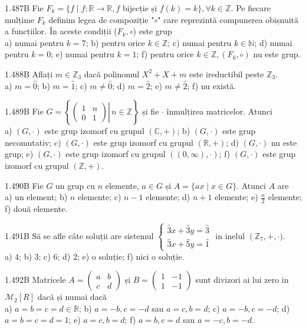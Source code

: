 \documentclass[11pt]{article}
\begin{document}
1.487B Fie $F_{k}=\{f \mid f: \mathbb{R} \rightarrow \mathbb{R}, f$ bijecție și $f(k)=k\}, \forall k \in \mathbb{Z}$. Pe fiecare mulțime $F_{k}$ definim legea de compoziție "$\circ$" care reprezintă compunerea obișnuită a funcțiilor. În aceste condiții ($F_{k}, \circ$) este grup\\ a) numai pentru $k=7$; b) pentru orice $k \in \mathbb{Z}$; c) numai pentru $k \in \mathbb{N}$; d) numai pentru $k=0$; e) numai pentru $k=1$; f) pentru orice $k \in \mathbb{Z},\left(F_{k}, \circ\right)$ nu este grup.

1.488B Aflați $m \in \mathbb{Z}_{3}$ dacă polinomul $X^{2}+X+m$ este ireductibil peste $\mathbb{Z}_{3}$.\\ a) $m=\hat{0}$; b) $m=\hat{1}$; c) $m \neq \hat{0}$; d) $m=\hat{2}$; e) $m \neq \hat{2}$; f) nu există.

1.489B Fie $G=\left\{\left.\left(\begin{array}{ll}1 & n \\ 0 & 1\end{array}\right) \right\rvert\, n \in \mathbb{Z}\right\}$ și fie $\cdot$ înmulțirea matricelor. Atunci\\ a) $(G, \cdot)$ este grup izomorf cu grupul $(\mathbb{C},+)$; b) $(G, \cdot)$ este grup necomutativ; c) $(G, \cdot)$ este grup izomorf cu grupul $(\mathbb{R},+)$; d) $(G, \cdot)$ nu este grup; e) $(G, \cdot)$ este grup izomorf cu grupul $((0, \infty), \cdot)$; f) $(G, \cdot)$ este grup izomorf cu grupul $(\mathbb{Z},+)$.

1.490B Fie $G$ un grup cu $n$ elemente, $a \in G$ și $A=\{a x \mid x \in G\}$. Atunci $A$ are\\ a) un element; b) $n$ elemente; c) $n-1$ elemente; d) $n+1$ elemente; e) $\frac{n}{2}$ elemente; f) două elemente.

1.491B Să se afle câte soluții are sistemul $\left\{\begin{array}{l}\widehat{3} x+\widehat{3} y=\widehat{3} \\ \widehat{3} x+\widehat{5} y=\widehat{1}\end{array}\right.$ in inelul $\left(\mathbb{Z}_{7},+,\cdot\right.)$.\\ a) $4$; b) $3$; c) $6$; d) $2$; e) o soluție; f) nici o soluție.

1.492B Matricele $A=\left(\begin{array}{ll}a & b \\ c & d\end{array}\right)$ și $B=\left(\begin{array}{ll}1 & -1 \\ 1 & -1\end{array}\right)$ sunt divizori ai lui zero in $\mathcal{M}_{2}[R]$ dacă și numai dacă\\ a) $a=b=c=d \in \mathbb{R}$; b) $a=-b, c=-d$ sau $a=c, b=d$; c) $a=-b, c=-d$; d) $a=b=c=d=1$; e) $a=c, b=d$; f) $a=b, c=d$ sau $a=-c, b=-d$.
\end{document}
